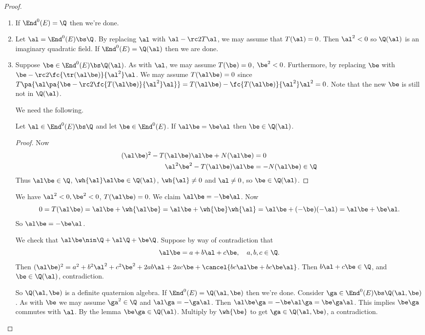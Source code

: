 \begin{proof}
\begin{enumerate}
\item
If $\End^0(E)=\Q$ then we're done.
\item
Let $\al=\End^0(E)\bs \Q$. By replacing $\al$ with $\al-\rc2T\al$, we may assume \wog{} that $T(\al)=0$. Then $\al^2<0$ so $\Q(\al)$ is an imaginary quadratic field. If $\End^0(E)=\Q(\al)$ then we are done.
\item
Suppose $\be\in \End^0(E)\bs\Q(\al)$. As with $\al$, we may assume $T(\be)=0$, $\be^2<0$. Furthermore, by replacing $\be$ with $\be-\rc2\fc{\tr(\al\be)}{\al^2}\al$. We may assume $T(\al\be)=0$
since $T\pa{\al\pa{\be-\rc 2\fc{T(\al\be)}{\al^2}\al}}=T(\al\be) -\fc{T(\al\be)}{\al^2}\al^2=0$. Note that the new $\be$ is still not in $\Q(\al)$.

We need the following.
\begin{lem}
Let $\al\in \End^0(E)\bs \Q$ and let $\be\in \End^0(E)$. If $\al\be=\be \al$ then $\be\in \Q(\al)$.
\end{lem}

\begin{proof}
Now
\begin{align*}
(\al\be)^2-T(\al\be)\al\be+N(\al\be)&=0\\
\al^2\be^2-T(\al\be)\al\be &=-N(\al\be)\in \Q
\end{align*}
Thus $\al\be\in \Q$, $\wh{\al}\al\be\in \Q(\al)$, $\wh{\al}\ne 0$ and $\al\ne 0$, so $\be\in \Q(\al)$.
\end{proof}

We have $\al^2<0,\be^2<0$, $T(\al\be)=0$. We claim $\al\be=-\be\al$. Now
\[
0=T(\al\be)=\al\be+\wh{\al\be}
=\al\be +\wh{\be}\wh{\al} 
=\al\be+(-\be)(-\al)=\al\be+\be\al.
\]
So $\al\be=-\be \al$.

We check that $\al\be \nin \Q+\al\Q+\be\Q$. Suppose by way of contradiction that 
\[
\al\be=a+b\al +c\be,\quad a,b,c\in \Q.
\]
Then $(\al\be)^2=a^2+b^2\al^2 +c^2\be^2+2ab\al + 2ac\be + \cancel{bc\al\be + bc \be \al}$. Then $b\al+c\be \in \Q$, and $\be \in \Q(\al)$, contradiction. 

So $\Q(\al,\be)$ is a definite quaternion algebra. If $\End^0(E)=\Q(\al,\be)$ then we're done. Consider $\ga\in \End^0(E)\bs \Q(\al,\be)$. As with $\be $ we may assume \wog{} $\ga^2\in \Q$ and $\al\ga=-\ga\al$. Then $\al\be \ga=-\be \al \ga=\be\ga\al$. This implies $\be \ga$ commutes with $\al$. By the lemma $\be\ga\in \Q(\al)$. Multiply by $\wh{\be}$ to get $\ga\in \Q(\al,\be)$, a contradiction.
\end{enumerate}
\end{proof}
